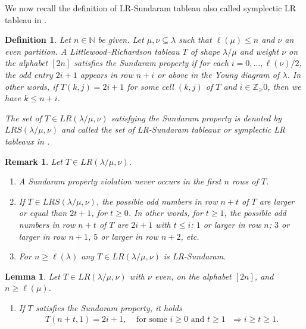 \documentclass[reqno]{amsart}
\theoremstyle{tplain}
\newtheorem{lem}{Lemma}
\newtheorem{obs}{Remark}
\newtheorem{defi}{Definition}
\begin{document}
{We now recall the definition of LR-Sundaram tableau also called symplectic LR tableau in \cite{watanabe}.

\begin{defi}\cite{sundaram,sundaram90} \label{def:lrs}Let $n\in \mathbb{N}$ be given.  Let $\mu,\nu\subseteq \lambda$ such that $\ell(\mu)\le n$ and $\nu$  an even partition. A Littlewood–Richardson tableau $T$ of shape $\lambda/\mu$ and weight $\nu$ on the alphabet $[2n]$ satisfies the
\emph{Sundaram property} if for each $i = 0,\dots , \ell(\nu)/2 $, the  odd entry $2i +1$ appears in row $n+i$
or above in the Young diagram of $\lambda$. In other words, if $T(k, j) = 2i + 1$ for some cell $(k,j)$ of $T$ and $i\in\mathbb{Z}_\ge 0$, then we have $k \le n + i$.

The set of $T \in  LR(\lambda/\mu, \nu)$ satisfying
the Sundaram property is denoted by $LRS(\lambda/\mu, \nu)$ and called the set of
\emph{  LR-Sundaram tableaux} or \emph{symplectic  LR tableaux} in \cite{watanabe}.
\end{defi}

\begin{obs} Let $T\in LR(\lambda/\mu, \nu)$.
\begin{enumerate}
\item A Sundaram property violation never occurs in the first $n$ rows of $T$.

\item If $T\in LRS(\lambda/\mu, \nu)$, the possible odd numbers  in row $n+t$ of $T$ are  larger or equal than $2t+1$, for $t\ge 0$. In other words, for $t\ge 1$, the  possible odd numbers in row $n+t$ of $T$ are $2i+1$ with $t\le i$: $1$ or larger in row $n$; $3$ or larger in row $n+1$, $5$ or larger in row $n+2$, etc.


\item For $n\ge \ell(\lambda)$ any $T\in LR(\lambda/\mu, \nu)$ is LR-Sundaram.
\end{enumerate}
\end{obs}

\begin{lem}\label{lem:firstcolumn} Let $T\in LR(\lambda/\mu,\nu)$ with $\nu$ even, on the alphabet $[2n]$, and $n\ge \ell(\mu)$.
\begin{enumerate}
\item If  $T$ satisfies the Sundaram property, it holds
\begin{align}T(n+t,1)=2i+1, &\mbox{ for some $i\ge 0$ and $t\ge 1$ }\Rightarrow i\ge t\ge 1. \label{firstcolumn}\end{align}


\end{enumerate}
\end{lem}}
\end{document}
